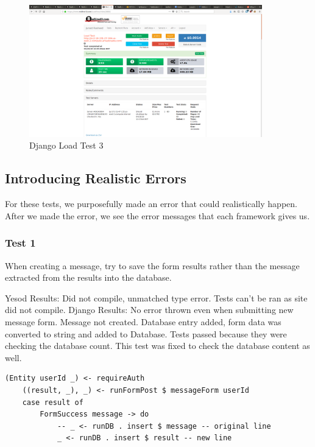 \begin{figure}[H]
	\centering
	\includegraphics[width=0.9\textwidth]{final_report/pics/djangoLoadTest3.png}
	\caption{Django Load Test 3}
	\label{fig:djangoLoadTest3}
\end{figure}

\subsection{Introducing Realistic Errors}

For these tests, we purposefully made an error that could realistically happen.
After we made the error, we see the error messages that each framework gives us.

\subsubsection{Test 1}
When creating a message, try to save the form results rather than
the message extracted from the results into the database.

Yesod Results: Did not compile, unmatched type error. Tests can't be ran
as site did not compile.
Django Results: No error thrown even when submitting new message form.
Message not created. Database entry added, form data was converted to
string and added to Database. Tests passed because they were checking
the database count. This test was fixed to check the database content
as well.

\begin{lstlisting}[caption={Yesod Code Change},label={code:yesodTest1LC}]
	(Entity userId _) <- requireAuth
	((result, _), _) <- runFormPost $ messageForm userId
	case result of
		FormSuccess message -> do
			-- _ <- runDB . insert $ message -- original line 
			_ <- runDB . insert $ result -- new line 
\end{lstlisting}

